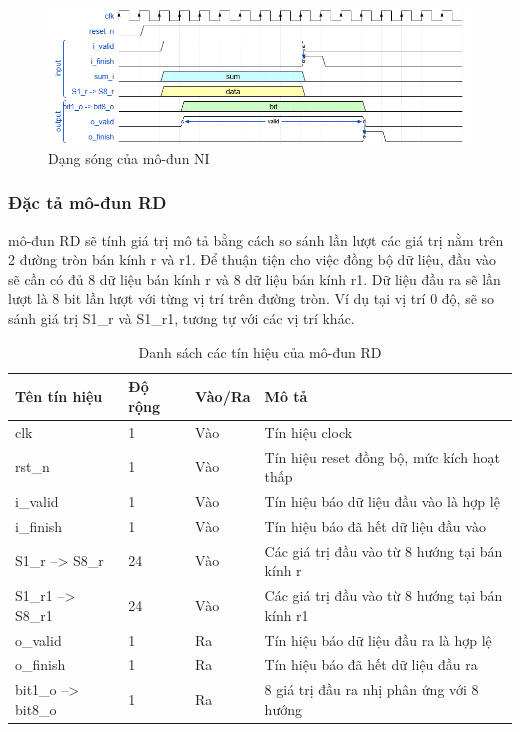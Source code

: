\begin{figure}[H]
    \centering
    \includegraphics[width=\linewidth]{figures/ni.png}
    \caption{Dạng sóng của mô-đun NI}
    \label{fig:ni}
\end{figure}

\subsubsection{Đặc tả mô-đun RD}
mô-đun RD sẽ tính giá trị mô tả bằng cách so sánh lần lượt các giá trị nằm trên 2 đường tròn bán kính r và r1. Để thuận tiện cho việc đồng bộ dữ liệu, đầu vào sẽ cần có đủ 8 dữ liệu bán kính r và 8 dữ liệu bán kính r1. Dữ liệu đầu ra sẽ lần lượt là 8 bit lần lượt với từng vị trí trên đường tròn. Ví dụ tại vị trí 0 độ, sẽ so sánh giá trị S1\_r và S1\_r1, tương tự với các vị trí khác. 
\begin{table}[H]
    \centering
    \renewcommand{\arraystretch}{1.3} %
        \caption{Danh sách các tín hiệu của mô-đun RD}
    \begin{tabular}{|p{3cm} p{2cm} p{2cm} p{8cm}|}
        \hline
        \rowcolor{gray!30}
        \textbf{Tên tín hiệu} & \textbf{Độ rộng} & \textbf{Vào/Ra} & \textbf{Mô tả} \\
        \hline
        clk & 1 & Vào & Tín hiệu clock \\
        \hline
        rst\_n & 1 & Vào & Tín hiệu reset đồng bộ, mức kích hoạt thấp \\
        \hline
        i\_valid & 1 & Vào & Tín hiệu báo dữ liệu đầu vào là hợp lệ \\
        \hline
        i\_finish & 1 & Vào & Tín hiệu báo đã hết dữ liệu đầu vào \\
        \hline
        S1\_r --> S8\_r & 24 & Vào & Các giá trị đầu vào từ 8 hướng tại bán kính r\\
        \hline
        S1\_r1 --> S8\_r1 & 24 & Vào & Các giá trị đầu vào từ 8 hướng tại bán kính r1\\
        \hline
        o\_valid & 1 & Ra & Tín hiệu báo dữ liệu đầu ra là hợp lệ\\
        \hline
        o\_finish & 1 & Ra & Tín hiệu báo đã hết dữ liệu đầu ra \\
        \hline
        bit1\_o --> bit8\_o & 1 & Ra & 8 giá trị đầu ra nhị phân ứng với 8 hướng \\
        \hline
    \end{tabular}

    \label{tab:signalListRD}
\end{table}
